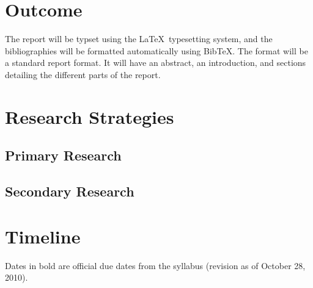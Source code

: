 \documentclass[12pt]{article}
\newcommand{\BibTeX}{{\sc Bib}\TeX}
\newcommand{\latex}{\LaTeX\ }
\begin{document}
\section{Outcome}
The report will be typset using the \latex typesetting system, and the
bibliographies will be formatted automatically using \BibTeX.  The
format will be a standard report format.  It will have an abstract, an
introduction, and sections detailing the different parts of the report.
\section{Research Strategies}
\subsection{Primary Research}

\subsection{Secondary Research}
\label{secondary-research}

\section{Timeline}
Dates in bold are official due dates from the syllabus (revision as of
October 28, 2010).
\end{document}
